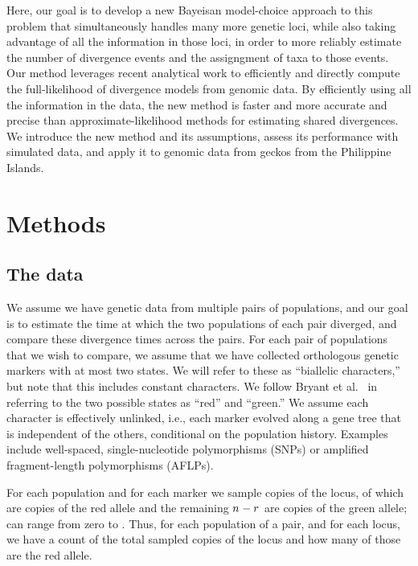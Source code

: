 Here, our goal is to develop a new Bayeisan model-choice approach to this
problem that simultaneously handles many more genetic loci, while also taking
advantage of all the information in those loci, in order to more reliably
estimate the number of divergence events and the assigngment of taxa to those
events.
Our method leverages recent analytical work \citep{Bryant2012} to efficiently
and directly compute the full-likelihood of divergence models from genomic
data.
By efficiently using all the information in the data, the new method is faster
and more accurate and precise than approximate-likelihood methods for
estimating shared divergences.
We introduce the new method and its assumptions, assess its performance with
simulated data, and apply it to genomic data from geckos from the Philippine
Islands.


\section{Methods}

\subsection{The data}
We assume we have genetic data from multiple pairs of populations, and our goal
is to estimate the time at which the two populations of each pair diverged, and
compare these divergence times across the pairs.
For each pair of populations that we wish to compare, we assume that we have
collected orthologous genetic markers with at most two states.
We will refer to these as ``biallelic characters,'' but note that this includes
constant characters.
We follow Bryant et al.\ \citeyear{Bryant2012} in referring to the two possible
states as ``red'' and ``green.''
We assume each character is effectively unlinked, i.e., each marker evolved
along a gene tree that is independent of the others, conditional on the
population history.
Examples include well-spaced, single-nucleotide polymorphisms (SNPs) or
amplified fragment-length polymorphisms (AFLPs).

For each population and for each marker we sample \allelecount
copies of the locus, \redallelecount of which are copies of the red
allele and the remaining $n_{}^{} - r_{}^{}$ are
copies of the green allele;
\redallelecount can range from zero to \allelecount.
Thus, for each population of a pair, and for each locus, we have a count of the
total sampled copies of the locus and how many of those are the red allele.

